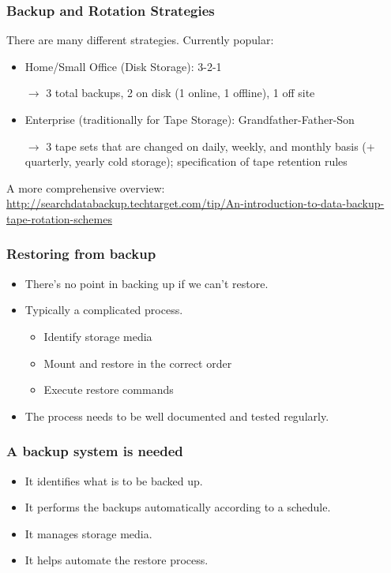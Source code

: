 \documentclass[10pt]{beamer}
\begin{document}
\begin{frame}
\frametitle{Backup and Rotation Strategies}

There are many different strategies. Currently popular:

\begin{itemize}
\item Home/Small Office (Disk Storage): 3-2-1 

$\rightarrow$ 3 total backups, 2 on disk (1 online, 1 offline), 1 off site
\item Enterprise (traditionally for Tape Storage): Grandfather-Father-Son 

$\rightarrow$ 3 tape sets that are changed on daily, weekly, and monthly basis (+ quarterly, yearly cold storage); specification of tape retention rules
\end{itemize}

A more comprehensive overview: \url{http://searchdatabackup.techtarget.com/tip/An-introduction-to-data-backup-tape-rotation-schemes}

\end{frame}

\begin{frame}
  \frametitle{Restoring from backup}
 

\begin{itemize}
\item There's no point in backing up if we can't restore.
\item Typically a complicated process.
      \begin{itemize}
        \item Identify storage media
	\item Mount and restore in the correct order
	\item Execute restore commands
      \end{itemize}
\item The process needs to be well documented and tested regularly.
\end{itemize}
\end{frame}


\begin{frame}
  \frametitle{A backup system is needed}

\begin{itemize}
\item It identifies what is to be backed up.
\item It performs the backups automatically according to a schedule.
\item It manages storage media.
\item It helps automate the restore process.
\end{itemize}
\end{frame}
\end{document}
